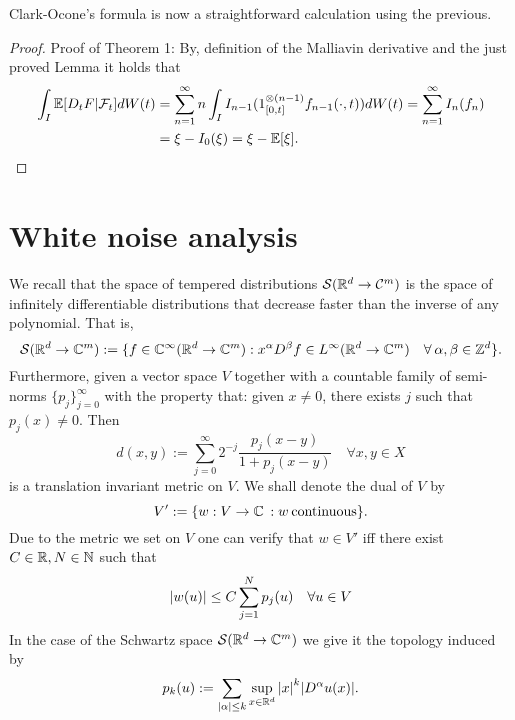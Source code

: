 \documentclass[12pt]{article}
\begin{document}
Clark-Ocone's formula is now a straightforward calculation using the previous.
\begin{proof}Proof of Theorem 1: By, definition of the Malliavin derivative and the just proved Lemma it holds that
	\begin{align*}
		\int_{I}\mathbb{E}[D_tF|\mathcal{F}_t] dW(t) & =\sum_{n=1}^{\infty} n\int_{I} I_{n-1}(1_{[0,t]}^{\otimes(n-1)}f_{n-1}(\cdot ,t))dW(t)=\sum_{n=1}^{\infty} I_n(f_n) \\
		                             & =\xi -I_0(\xi )=\xi -\mathbb{E}[\xi ].
	\end{align*}


\end{proof}

\section{White noise analysis}
We recall that the space of tempered distributions ${\mathcal S}({\mathbb R}^d\to \mathcal{C}^m)$ is the space of infinitely differentiable distributions that decrease faster than the inverse of any polynomial. That is,
\begin{equation*}
	\mathcal{S}({\mathbb R}^d\to\mathbb{C}^m):=\lbrace f\in\mathbb{C}^\infty({\mathbb R}^d\to\mathbb{C}^m):x^\alpha D^\beta f\in L^\infty({\mathbb R}^d\to\mathbb{C}^m)\quad\forall\hspace{2pt}\alpha,\beta\in {\mathbb Z}^d\rbrace.
\end{equation*}
Furthermore, given a  vector space $V$ together with a countable family of semi-norms $\lbrace p_j\rbrace_{j=0}^\infty$ with the property that: given $x\neq 0$, there exists $j$ such that $p_j(x)\neq 0$. Then
\begin{equation}\label{seminormsgivemetric}
	d(x,y):=\sum_{j=0}^\infty 2^{-j}\frac{p_j(x-y)}{1+p_j(x-y)}\quad\forall{x,y}\in{X}
\end{equation}
is a translation invariant metric on $V$. We shall denote the dual of $V$  by \[V':=\lbrace w:V\to\mathbb{C}\hspace{2pt}: w \hspace{2pt}\text{continuous}\rbrace.\]
Due to the metric we set on $V$ one can verify that $w\in V'$ iff there exist $C\in{\mathbb R},N\in\mathbb{N}$ such that
\begin{equation}\label{linearityFrechspace}
	\abs{w(u)}\leq C\sum_{j=1}^N p_j(u)\quad\forall{u}\in{V}
\end{equation}
In the case of the Schwartz space ${\mathcal S}({\mathbb R}^d\to\mathbb{C}^m)$ we give it the topology induced by
\begin{equation}\label{seminornormsSchwartz}
	p_k(u):=\sum_{\abs{\alpha}\leq k} \sup_{x\in{\mathbb R}^d}\abs{x}^k \abs{D^\alpha u(x)}.
\end{equation}
\end{document}
